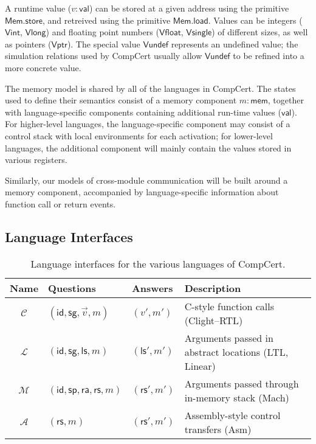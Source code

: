 \documentclass[acmsmall,timestamp,review,anonymous]{acmart}
\newcommand{\kw}[1]{\ensuremath{ \mathsf{#1} }}
\begin{document}
A runtime value ($v : \kw{val}$) can be stored at
a given address using the primitive \kw{Mem.store},
and retreived using the primitive \kw{Mem.load}.
Values can be integers (\kw{Vint}, \kw{Vlong}) and
floating point numbers (\kw{Vfloat}, \kw{Vsingle})
of different sizes,
as well as pointers (\kw{Vptr}).
The special value \kw{Vundef}
represents an undefined value;
the simulation relations used by CompCert
usually allow $\kw{Vundef}$
to be refined into a more concrete value.

The memory model is shared by all of the languages in CompCert.
The states used to define their semantics consist of
a memory component $m : \kw{mem}$,
together with language-specific components
containing additional run-time values ($\kw{val}$).
For higher-level languages,
the language-specific component may consist of
a control stack with local environments for each activation;
for lower-level languages,
the additional component will mainly contain
the values stored in various registers.

Similarly,
our models of cross-module communication
will be built around a memory component,
accompanied by language-specific information
about function call or return events.


\subsection{Language Interfaces} \label{sec:compcert:li} %

\begin{table*} %
  \begin{tabular}{clll}
    \hline
    Name & Questions & Answers & Description \\
    \hline
    $\mathcal{C}$ & $(\kw{id}, \kw{sg}, \vec{v}, m)$ & $(v', m')$ &
      C-style function calls (Clight--RTL) \\
    $\mathcal{L}$ & $(\kw{id}, \kw{sg}, \kw{ls}, m)$ & $(\kw{ls}', m')$ &
      Arguments passed in abstract locations (LTL, Linear) \\
    $\mathcal{M}$ & $(\kw{id}, \kw{sp},\kw{ra},\kw{rs}, m)$ & $(\kw{rs}', m')$ &
      Arguments passed through in-memory stack (Mach) \\
    $\mathcal{A}$ & $(\kw{rs}, m)$ & $(\kw{rs}', m')$ &
      Assembly-style control transfers (Asm) \\
    \hline
  \end{tabular}
  \caption{Language interfaces for the various languages of CompCert.}
  \label{tbl:li}
\end{table*}
\end{document}
